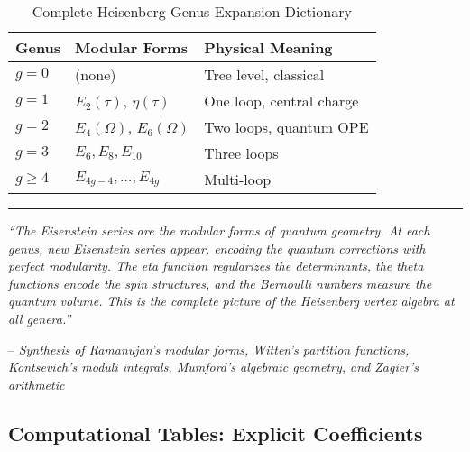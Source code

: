 \begin{table}[h]
\centering
\caption{Complete Heisenberg Genus Expansion Dictionary}
\label{tab:heisenberg-complete-dictionary}
\begin{tabular}{|l|l|l|}
\hline
\textbf{Genus} & \textbf{Modular Forms} & \textbf{Physical Meaning} \\
\hline
$g=0$ & (none) & Tree level, classical \\
\hline
$g=1$ & $E_2(\tau)$, $\eta(\tau)$ & One loop, central charge \\
\hline
$g=2$ & $E_4(\Omega)$, $E_6(\Omega)$ & Two loops, quantum OPE \\
\hline
$g=3$ & $E_6, E_8, E_{10}$ & Three loops \\
\hline
$g \geq 4$ & $E_{4g-4}, \ldots, E_{4g}$ & Multi-loop \\
\hline
\end{tabular}
\end{table}

\begin{center}
\rule{0.5\textwidth}{0.4pt}

\textit{``The Eisenstein series are the modular forms of quantum geometry. At each 
genus, new Eisenstein series appear, encoding the quantum corrections with perfect 
modularity. The eta function regularizes the determinants, the theta functions encode 
the spin structures, and the Bernoulli numbers measure the quantum volume. This is 
the complete picture of the Heisenberg vertex algebra at all genera.''}

-- \textit{Synthesis of Ramanujan's modular forms, Witten's partition functions, \\
Kontsevich's moduli integrals, Mumford's algebraic geometry, and Zagier's arithmetic}
\end{center}

\subsection{Computational Tables: Explicit Coefficients}
\label{subsec:explicit-coefficients-tables}

